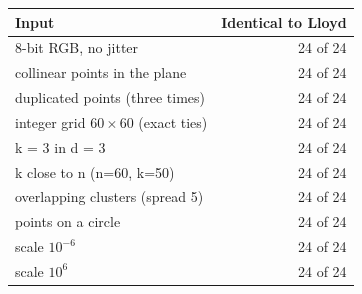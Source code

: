 \begin{tabular}{lr}
\toprule
Input & Identical to Lloyd \\
\midrule
8-bit RGB, no jitter & 24 of 24 \\
collinear points in the plane & 24 of 24 \\
duplicated points (three times) & 24 of 24 \\
integer grid $60\times60$ (exact ties) & 24 of 24 \\
k = 3 in d = 3 & 24 of 24 \\
k close to n (n=60, k=50) & 24 of 24 \\
overlapping clusters (spread 5) & 24 of 24 \\
points on a circle & 24 of 24 \\
scale $10^{-6}$ & 24 of 24 \\
scale $10^{6}$ & 24 of 24 \\
\bottomrule
\end{tabular}
